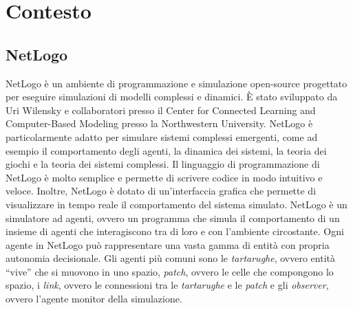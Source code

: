 \chapter{Contesto}
\section{NetLogo}
NetLogo\space\cite{wilensky1997netlogo} è un ambiente di programmazione e simulazione open-source
progettato per eseguire simulazioni di modelli complessi e dinamici. È stato sviluppato da Uri Wilensky
e collaboratori presso il Center for Connected Learning and Computer-Based Modeling presso la Northwestern University.
NetLogo è particolarmente adatto per simulare sistemi complessi emergenti, come ad esempio il comportamento
degli agenti, la dinamica dei sistemi, la teoria dei giochi e la teoria dei sistemi complessi.
Il linguaggio di programmazione di NetLogo è molto semplice e permette di scrivere codice in modo
intuitivo e veloce. Inoltre, NetLogo è dotato di un'interfaccia grafica che permette di visualizzare
in tempo reale il comportamento del sistema simulato. NetLogo è un simulatore ad agenti, ovvero un
programma che simula il comportamento di un insieme di agenti che interagiscono tra di loro e con
l'ambiente circostante. Ogni agente in NetLogo può rappresentare una vasta gamma di entità con propria autonomia
decisionale. Gli agenti più comuni sono le \textit{tartarughe}, ovvero entità ``vive'' che si muovono in uno spazio,
\textit{patch}, ovvero le celle che compongono lo spazio, i \textit{link}, ovvero le connessioni tra le \textit{tartarughe} e 
le \textit{patch} e gli \textit{observer}, ovvero l'agente monitor della simulazione.

